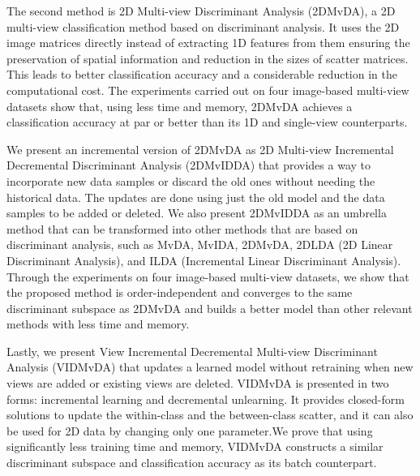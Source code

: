{The second method is 2D Multi-view Discriminant Analysis (2DMvDA), a 2D multi-view classification method based on discriminant analysis. It uses the 2D image matrices directly instead of extracting 1D features from them ensuring the preservation of spatial information and reduction in the sizes of scatter matrices. This leads to better classification accuracy and a considerable reduction in the computational cost. The experiments carried out on four image-based multi-view datasets show that, using less time and memory, 2DMvDA achieves a classification accuracy at par or better than its 1D and single-view counterparts.%

We present an incremental version of 2DMvDA as 2D Multi-view Incremental Decremental Discriminant Analysis (2DMvIDDA) that provides a way to incorporate new data samples or discard the old ones without needing the historical data. The updates are done using just the old model and the data samples to be added or deleted. We also present 2DMvIDDA as an umbrella method that can be transformed into other methods that are based on discriminant analysis, such as MvDA, MvIDA, 2DMvDA, 2DLDA (2D Linear Discriminant Analysis), and ILDA (Incremental Linear Discriminant Analysis). Through the experiments on four image-based multi-view datasets, we show that the proposed method is order-independent and converges to the same discriminant subspace as 2DMvDA and builds a better model than other relevant methods with less time and memory.%

Lastly, we present View Incremental Decremental Multi-view Discriminant Analysis (VIDMvDA) that updates a learned model without retraining when new views are added or existing views are deleted. VIDMvDA is presented in two forms: incremental learning and decremental unlearning. It provides closed-form solutions to update the within-class and the between-class scatter, and it can also be used for 2D data by changing only one parameter.We prove that using significantly less training time and memory, VIDMvDA constructs a similar discriminant subspace and classification accuracy as its batch counterpart.%


\chapterend
}
